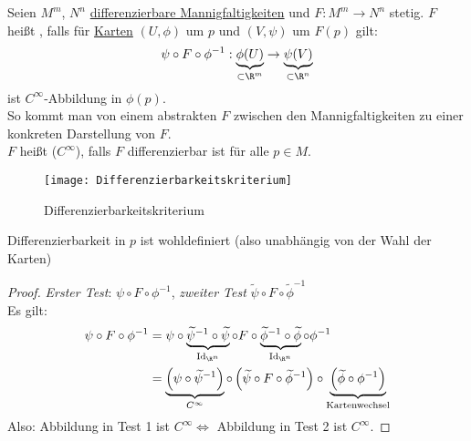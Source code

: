 \begin{definition}[Differenzierbarkeit]
  Seien \( M^m \), \( N^n \) \hyperref[def:dbmannigfaltigkeit]{differenzierbare Mannigfaltigkeiten} und \( F: M^m \to N^n \) stetig. \( F \) heißt \label{def:differenzierbar}, falls für \hyperref[def:karte]{Karten} \( (U, \phi) \) um \( p \) und \( (V, \psi) \) um \( F(p) \) gilt:
  \begin{equation*}
    \psi \circ F \circ \phi^{-1}: \underbrace{\phi(U)}_{\subset \R^m} \to \underbrace{\psi(V)}_{\subset \R^n}
  \end{equation*}
  ist \( C^\infty \)-Abbildung in \( \phi(p) \). \\
  So kommt man von einem abstrakten \( F \) zwischen den Mannigfaltigkeiten zu einer konkreten Darstellung von \( F \). \\
  \( F \) heißt  (\( C^\infty \)), falls \( F \) differenzierbar ist für alle \( p \in M \).
  \begin{figure}[H]
    \texttt{[image: Differenzierbarkeitskriterium]}
    \caption{Differenzierbarkeitskriterium}
  \end{figure}
\end{definition}

\begin{remark}
  Differenzierbarkeit in \( p \) ist wohldefiniert (also unabhängig von der Wahl der Karten)
  \begin{proof}
    \emph{Erster Test}: \( \psi \circ F \circ \phi^{-1} \), \emph{zweiter Test} \( \widetilde{\psi} \circ F \circ \widetilde{\phi}^{-1} \) \\
    Es gilt:
    \begin{align*}
      \psi \circ F \circ \phi^{-1} &= \psi \circ \underbrace{\widetilde{\psi}^{-1} \circ \widetilde{\psi}}_{\text{Id}_{\R^n}} \circ F \circ \underbrace{\widetilde{\phi}^{-1} \circ \widetilde{\phi}}_{\text{Id}_{\R^n}} \circ \phi^{-1} \\
        &= \underbrace{\left( \psi \circ \widetilde{\psi}^{-1} \right)}_{C^\infty} \circ \left( \widetilde{\psi} \circ F \circ \widetilde{\phi}^{-1} \right) \circ \underbrace{\left( \widetilde{\phi} \circ \phi^{-1} \right)}_{\text{Kartenwechsel}}
    \end{align*}
    Also: Abbildung in Test 1 ist \( C^\infty \Leftrightarrow \) Abbildung in Test 2 ist \( C^\infty \).
  \end{proof}
\end{remark}

